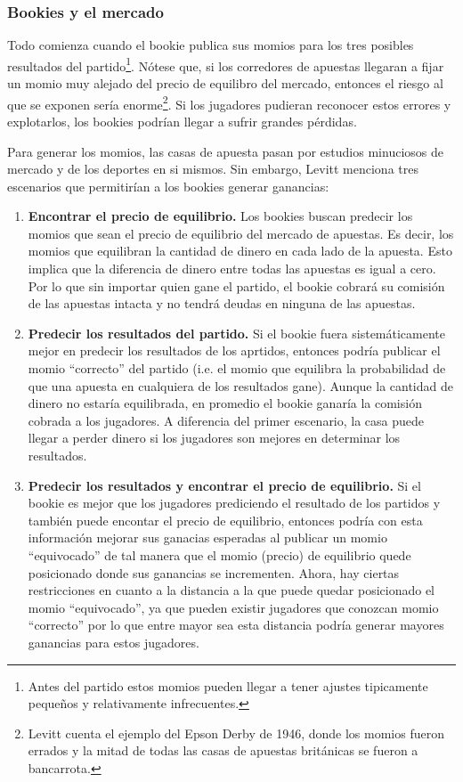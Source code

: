 \subsubsection{Bookies y el mercado}
Todo comienza cuando el bookie publica sus momios para los tres posibles resultados del partido\footnote{Antes del partido estos momios pueden llegar a tener ajustes tipicamente pequeños y relativamente infrecuentes.}. Nótese que, si los corredores de apuestas llegaran a fijar un momio muy alejado del precio de equilibro del mercado, entonces el riesgo al que se exponen sería enorme\footnote{Levitt \cite{levitt2004gambling} cuenta el ejemplo del Epson Derby de 1946, donde los momios fueron errados y la mitad de todas las casas de apuestas británicas se fueron a bancarrota.}. Si los jugadores pudieran reconocer estos errores y explotarlos, los bookies podrían llegar a sufrir grandes pérdidas.

Para generar los momios, las casas de apuesta pasan por estudios minuciosos de mercado y de los deportes en si mismos. Sin embargo, Levitt \cite{levitt2004gambling} menciona tres escenarios que permitirían a los bookies generar ganancias:
\begin{enumerate}
	\item \textbf{Encontrar el precio de equilibrio.} Los bookies buscan predecir los momios que sean el precio de equilibrio del mercado de apuestas. Es decir, los momios que equilibran la cantidad de dinero en cada lado de la apuesta. Esto implica que la diferencia de dinero entre todas las apuestas es igual a cero. Por lo que sin importar quien gane el partido, el bookie cobrará su comisión de las apuestas intacta y no tendrá deudas en ninguna de las apuestas.
	\item \textbf{Predecir los resultados del partido.} Si el bookie fuera sistemáticamente mejor en predecir los resultados de los aprtidos, entonces podría publicar el momio ``correcto'' del partido (i.e. el momio que equilibra la probabilidad de que una apuesta en cualquiera de los resultados gane). Aunque la cantidad de dinero no estaría equilibrada, en promedio el bookie ganaría la comisión cobrada a los jugadores. A diferencia del primer escenario, la casa puede llegar a perder dinero si los jugadores son mejores en determinar los resultados.
	\item \textbf{Predecir los resultados y encontrar el precio de equilibrio.} Si el bookie es mejor que los jugadores prediciendo el resultado de los partidos y también puede encontar el precio de equilibrio, entonces podría con esta información mejorar sus ganacias esperadas al publicar un momio ``equivocado'' de tal manera que el momio (precio) de equilibrio quede posicionado donde sus ganancias se incrementen. Ahora, hay ciertas restricciones en cuanto a la distancia a la que puede quedar posicionado el momio ``equivocado'', ya que pueden existir jugadores que conozcan momio ``correcto'' por lo que entre mayor sea esta distancia podría generar mayores ganancias para estos jugadores.
\end{enumerate}


